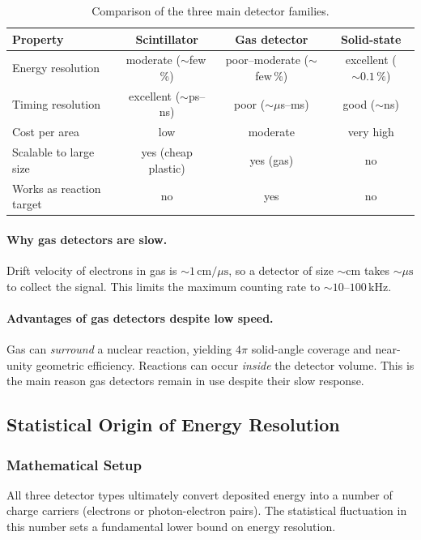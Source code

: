 \begin{table}[h]
\centering
\small
\begin{tabular}{lccc}
\toprule
Property & Scintillator & Gas detector & Solid-state \\
\midrule
Energy resolution & moderate ($\sim$few\,\%) & poor–moderate ($\sim$few\,\%) & excellent ($\sim 0.1\,\%$) \\
Timing resolution & excellent ($\sim$ps–ns) & poor ($\sim\mu$s–ms) & good ($\sim$ns) \\
Cost per area & low & moderate & very high \\
Scalable to large size & yes (cheap plastic) & yes (gas) & no \\
Works as reaction target & no & yes & no \\
\bottomrule
\end{tabular}
\caption{Comparison of the three main detector families.}
\label{tab:lec07:detectors}
\end{table}

\paragraph{Why gas detectors are slow.}
Drift velocity of electrons in gas is $\sim 1\,\text{cm}/\mu\text{s}$,
so a detector of size $\sim\text{cm}$ takes $\sim\mu\text{s}$ to collect
the signal.  This limits the maximum counting rate to $\sim 10$–$100\,\text{kHz}$.

\paragraph{Advantages of gas detectors despite low speed.}
Gas can \emph{surround} a nuclear reaction, yielding $4\pi$ solid-angle
coverage and near-unity geometric efficiency.  Reactions can occur
\emph{inside} the detector volume.  This is the main reason gas detectors
remain in use despite their slow response.

\subsection{Statistical Origin of Energy Resolution}
\label{subsec:lec07:resolution}

\subsubsection*{Mathematical Setup}
All three detector types ultimately convert deposited energy into a number of
charge carriers (electrons or photon-electron pairs).  The statistical
fluctuation in this number sets a fundamental lower bound on energy resolution.

